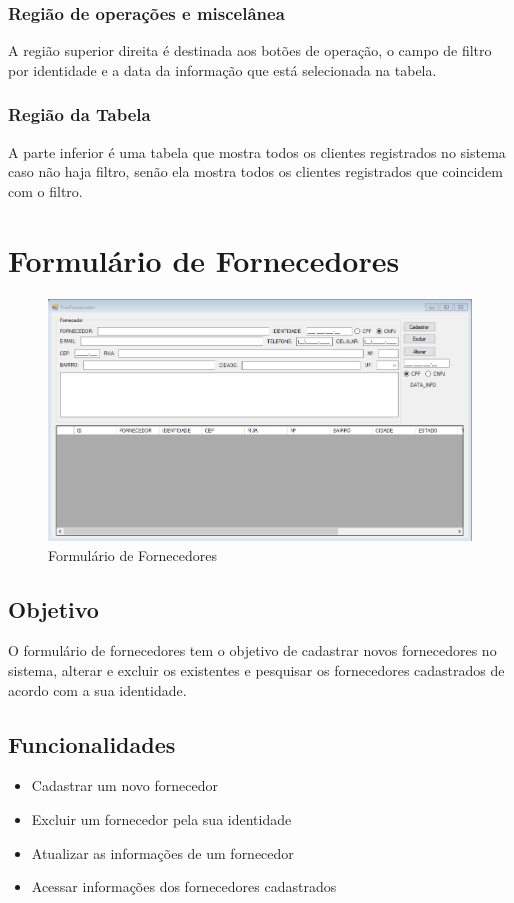 \documentclass[
	article,			%
	12pt,				%
	oneside,			%
	a4paper,			%
	english,			%
	brazil,				%
	sumario=tradicional
	]{abntex2}
\begin{document}
			\subsubsection{Região de operações e miscelânea}
			A região superior direita é destinada aos botões de operação, o campo de filtro por identidade e a data da informação que está selecionada na tabela.
			\subsubsection{Região da Tabela}
			A parte inferior é uma tabela que mostra todos os clientes registrados no sistema caso não haja filtro, senão ela mostra todos os clientes registrados que coincidem com o filtro.
	\newpage
	\section{Formulário de Fornecedores}
		\begin{figure}[!htb]
			\centering
			\includegraphics[scale=0.6]{./Figuras/FrmFornecedor.png}
			\caption{Formulário de Fornecedores}
		\end{figure}
		\subsection{Objetivo}
		O formulário de fornecedores tem o objetivo de cadastrar novos fornecedores no sistema, alterar e excluir os existentes e pesquisar os fornecedores cadastrados de acordo com a sua identidade.
		\subsection{Funcionalidades}
			\begin{itemize}
			\item Cadastrar um novo fornecedor
			\item Excluir um fornecedor pela sua identidade
			\item Atualizar as informações de um fornecedor
			\item Acessar informações dos fornecedores cadastrados
			\end{itemize}
\end{document}
